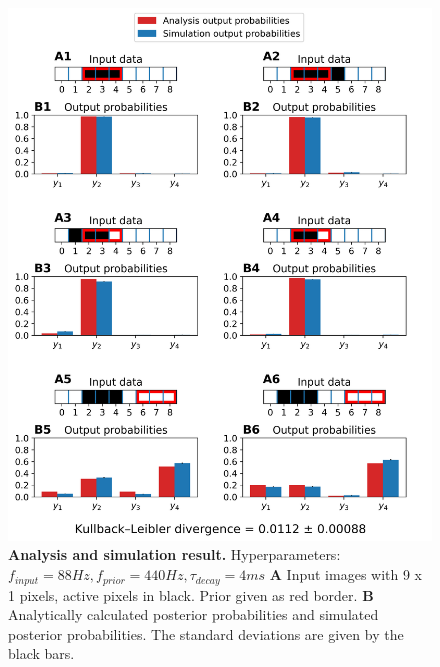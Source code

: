 \begin{figure}
  \includegraphics[width=\linewidth]{figures/1D/1D_88_440_4.png}
       \caption{\textbf{Analysis and simulation result. } Hyperparameters: $f_{input} = 88 Hz, f_{prior} = 440 Hz, \tau_{decay} = 4 ms$ \textbf{A} Input images with 9 x 1 pixels, active pixels in black. Prior given as red border. \textbf{B} Analytically calculated posterior probabilities and simulated posterior probabilities. The standard deviations are given by the black bars.}
  \label{fig:1D_88_440_4}
\end{figure}

